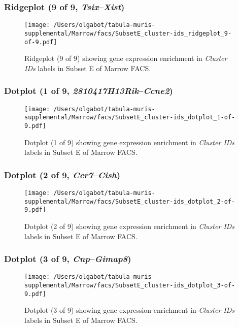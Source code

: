 \clearpage

\subsubsection{Ridgeplot (9 of 9, \emph{Tsix}--\emph{Xist})}
\begin{figure}[h]
\centering
\texttt{[image: /Users/olgabot/tabula-muris-supplemental/Marrow/facs/SubsetE\_cluster-ids\_ridgeplot\_9-of-9.pdf]}

\caption{ Ridgeplot (9 of 9)  showing gene expression enrichment in \emph{Cluster IDs} labels in Subset E of Marrow FACS. }
\end{figure}


\clearpage

\subsubsection{Dotplot (1 of 9, \emph{2810417H13Rik}--\emph{Ccne2})}
\begin{figure}[h]
\centering
\texttt{[image: /Users/olgabot/tabula-muris-supplemental/Marrow/facs/SubsetE\_cluster-ids\_dotplot\_1-of-9.pdf]}

\caption{ Dotplot (1 of 9)  showing gene expression enrichment in \emph{Cluster IDs} labels in Subset E of Marrow FACS. }
\end{figure}


\clearpage

\subsubsection{Dotplot (2 of 9, \emph{Ccr7}--\emph{Cish})}
\begin{figure}[h]
\centering
\texttt{[image: /Users/olgabot/tabula-muris-supplemental/Marrow/facs/SubsetE\_cluster-ids\_dotplot\_2-of-9.pdf]}

\caption{ Dotplot (2 of 9)  showing gene expression enrichment in \emph{Cluster IDs} labels in Subset E of Marrow FACS. }
\end{figure}


\clearpage

\subsubsection{Dotplot (3 of 9, \emph{Cnp}--\emph{Gimap8})}
\begin{figure}[h]
\centering
\texttt{[image: /Users/olgabot/tabula-muris-supplemental/Marrow/facs/SubsetE\_cluster-ids\_dotplot\_3-of-9.pdf]}

\caption{ Dotplot (3 of 9)  showing gene expression enrichment in \emph{Cluster IDs} labels in Subset E of Marrow FACS. }
\end{figure}


